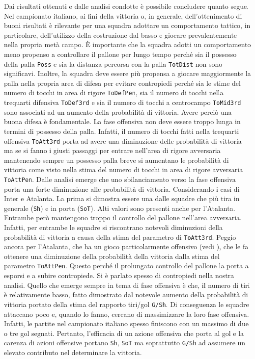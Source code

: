 Dai risultati ottenuti e dalle analisi condotte è possibile concludere quanto segue. Nel campionato italiano, ai fini della vittoria o, in generale, dell'ottenimento di buoni risultati è rilevante per una squadra adottare un comportamento tattico, in particolare, dell'utilizzo della costruzione dal basso e giocare prevalentemente nella propria metà campo. 
È importante che la squadra adotti un comportamento meno propenso a controllare il pallone per lungo tempo perché sia il possesso della palla \texttt{Poss} e sia la distanza percorsa con la palla \texttt{TotDist} non sono significavi. Inoltre, la squadra deve essere più propensa a giocare maggiormente la palla nella propria area di difesa per evitare contropiedi perché sia le stime del numero di tocchi in area di rigore \texttt{ToDefPen}, sia il numero di tocchi nella trequarti difensiva \texttt{ToDef3rd} e sia il numero di tocchi a centrocampo \texttt{ToMid3rd} sono associati ad un aumento della probabilità di vittoria. Avere perciò una buona difesa è fondamentale. La fase offensiva non deve essere troppo lunga in termini di possesso della palla. Infatti, il numero di tocchi fatti nella trequarti offensiva \texttt{ToAtt3rd} porta ad avere una diminuzione delle probabilità di vittoria ma se si fanno i giusti passaggi per entrare nell'area di rigore avversaria mantenendo sempre un possesso palla breve si aumentano le probabilità di vittoria come visto nella stima del numero di tocchi in area di rigore avversaria \texttt{ToAttPen}. Dalle analisi emerge che uno sbilanciamento verso la fase offensiva porta una forte diminuzione alle probabilità di vittoria. Considerando i casi di Inter e Atalanta. La prima si dimostra essere una dalle squadre che più tira in generale (\texttt{Sh}) e in porta (\texttt{SoT}). Alti valori sono presenti anche per l'Atalanta. Entrambe però mantengono troppo il controllo del pallone nell'area avversaria. Infatti, per entrambe le squadre si riscontrano notevoli diminuzioni della probabilità di vittoria a causa della stima del parametro di \texttt{ToAtt3rd}. Peggio ancora per l'Atalanta, che ha un gioco particolarmente offensivo (vedi \textit{\cite{ataGioco}}), che le fa ottenere una diminuzione della probabilità della vittoria dalla stima del parametro \texttt{ToAttPen}. Questo perché il prolungato controllo del pallone la porta a esporsi e a subire contropiede. Si è parlato spesso di contropiedi nella nostra analisi. Quello che emerge sempre in tema di fase offensiva è che, il numero di tiri è relativamente basso, fatto dimostrato dal notevole aumento della probabilità di vittoria portato della stima del rapporto tiri/gol \texttt{G/Sh}. Di conseguenza le squadre attaccano poco e, quando lo fanno, cercano di massimizzare la loro fase offensiva. Infatti, le partite nel campionato italiano spesso finiscono con un massimo di due o tre gol segnati. Pertanto, l'efficacia di un azione offensiva che porta al gol e la carenza di azioni offensive portano \texttt{Sh}, \texttt{SoT} ma soprattutto \texttt{G/Sh} ad assumere un elevato contributo nel determinare la vittoria.\\
